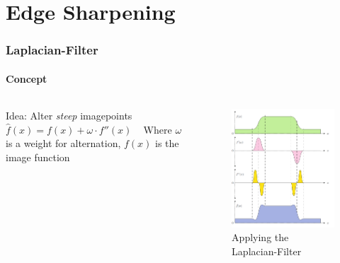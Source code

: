 \section{Edge Sharpening}
\begin{frame}
	\frametitle{Laplacian-Filter}
	\framesubtitle{Concept}
	\begin{columns}
		\begin{column}{0.5\textwidth}
			Idea: Alter \textit{steep} imagepoints \newline
			~\newline
			$\hat{f}(x)= f(x) + \omega \cdot f''(x)$ \newline
			~\newline
			Where $\omega$ is a weight for alternation, $f(x)$ is the image function
		\end{column}
		\begin{column}{0.5\textwidth}
			\begin{figure}
				\centering
				\includegraphics[width=0.8\linewidth]{images/Laplacian}
				\caption[Laplacian Plot]{Applying the Laplacian-Filter}
				\label{fig:laplacian}
			\end{figure}
		\end{column}
	\end{columns}
\end{frame}
